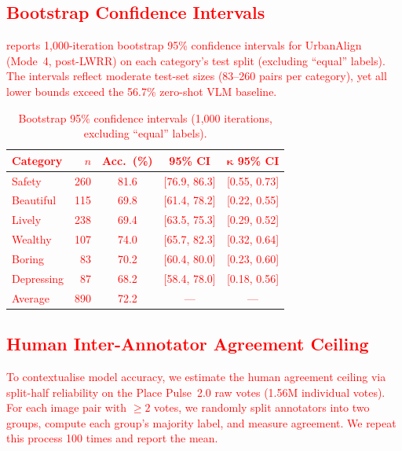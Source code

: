 \documentclass[runningheads]{llncs}
\begin{document}
\textcolor{red}{%
\subsection{Bootstrap Confidence Intervals}

 reports 1,000-iteration bootstrap 95\% confidence intervals for UrbanAlign (Mode~4, post-LWRR) on each category's test split (excluding ``equal'' labels).
The intervals reflect moderate test-set sizes (83--260 pairs per category), yet all lower bounds exceed the 56.7\% zero-shot VLM baseline.

\begin{table}[H]
\centering
\caption{Bootstrap 95\% confidence intervals (1,000 iterations, excluding ``equal'' labels).}
\label{tab:bootstrap}
\small
\begin{tabular}{lrccc}
\toprule
\textbf{Category} & $n$ & \textbf{Acc.\ (\%)} & \textbf{95\% CI} & $\boldsymbol{\kappa}$ \textbf{95\% CI} \\
\midrule
Safety      & 260 & 81.6 & [76.9, 86.3] & [0.55, 0.73] \\
Beautiful   & 115 & 69.8 & [61.4, 78.2] & [0.22, 0.55] \\
Lively      & 238 & 69.4 & [63.5, 75.3] & [0.29, 0.52] \\
Wealthy     & 107 & 74.0 & [65.7, 82.3] & [0.32, 0.64] \\
Boring      &  83 & 70.2 & [60.4, 80.0] & [0.23, 0.60] \\
Depressing  &  87 & 68.2 & [58.4, 78.0] & [0.18, 0.56] \\
\midrule
Average     & 890 & 72.2 & --- & --- \\
\bottomrule
\end{tabular}
\end{table}

\subsection{Human Inter-Annotator Agreement Ceiling}

To contextualise model accuracy, we estimate the human agreement ceiling via split-half reliability on the Place Pulse~2.0 raw votes (1.56M individual votes).
For each image pair with $\geq 2$ votes, we randomly split annotators into two groups, compute each group's majority label, and measure agreement.
We repeat this process 100 times and report the mean.

}
\end{document}
